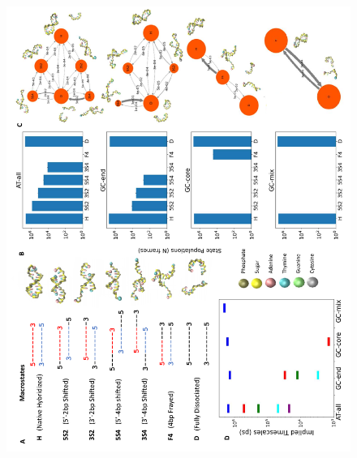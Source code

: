 \documentclass[journal=jpcbfk,manuscript=article]{achemso}
\begin{document}

\begin{figure}[ht!]
	\begin{center}
        \includegraphics[width=1.0\textwidth]{Fig2.pdf}
	\end{center}
\end{figure}
\end{document}
